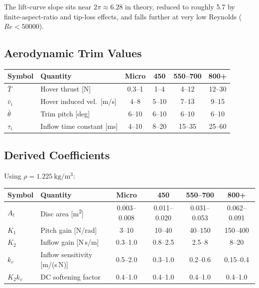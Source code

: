 \documentclass[11pt,a4paper]{article}
\newcommand{\At}{A_t}
\newcommand{\bvi}{\bar{v}_i}
\newcommand{\bT}{\bar{T}}
\newcommand{\btheta}{\bar{\theta}}
\begin{document}
\noindent The lift-curve slope sits near \(2\pi\approx 6.28\) in theory,
reduced to roughly 5.7 by finite-aspect-ratio and tip-loss effects, and falls
further at very low Reynolds (\(Re<\num{50000}\)).

\subsection{Aerodynamic Trim Values}

\begin{center}
\renewcommand{\arraystretch}{1.15}
\begin{tabular}{llcccc}
\toprule
Symbol & Quantity & Micro & 450 & 550--700 & 800+ \\
\midrule
\(\bT\)      & Hover thrust [N]              & 0.3--1 & 1--4 & 4--12 & 12--30 \\
\(\bvi\)     & Hover induced vel.\ [m/s]     & 4--8 & 5--10 & 7--13 & 9--15 \\
\(\btheta\)  & Trim pitch [deg]              & 6--10 & 6--10 & 6--10 & 6--10 \\
\(\tau_i\)   & Inflow time constant [ms]     & 4--10 & 8--20 & 15--35 & 25--60 \\
\bottomrule
\end{tabular}
\end{center}

\subsection{Derived Coefficients}

Using \(\rho = \SI{1.225}{\kilogram\per\cubic\metre}\):

\begin{center}
\renewcommand{\arraystretch}{1.15}
\begin{tabular}{llcccc}
\toprule
Symbol & Quantity & Micro & 450 & 550--700 & 800+ \\
\midrule
\(\At\)      & Disc area [\si{\square\metre}]   & 0.003--0.008 & 0.011--0.020 & 0.031--0.053 & 0.062--0.091 \\
\(K_1\)      & Pitch gain [N/rad]              & 3--10  & 10--40  & 40--150 & 150--400 \\
\(K_2\)      & Inflow gain [N\,s/m]            & 0.3--1.0 & 0.8--2.5 & 2.5--8 & 8--20 \\
\(k_v\)      & Inflow sensitivity [m/(s\,N)]   & 0.5--2.0 & 0.3--1.0 & 0.2--0.6 & 0.15--0.4 \\
\(K_2 k_v\)  & DC softening factor            & 0.4--1.0 & 0.4--1.0 & 0.4--1.0 & 0.4--1.0 \\
\bottomrule
\end{tabular}
\end{center}
\end{document}
